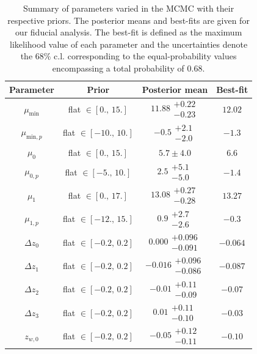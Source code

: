 \documentclass[a4paper,11pt]{article}
\newcommand\Tstrut{\rule{0pt}{3ex}}
\begin{document}
    \begin{table}
      \caption{Summary of parameters varied in the MCMC with their respective priors. The posterior means and best-fits are given for our fiducial analysis. The best-fit is defined as the maximum likelihood value of each parameter and the uncertainties denote the $68 \%$ c.l. corresponding to the equal-probability values encompassing a total probability of 0.68.} \label{tab:params}
      \begin{center}
        \begin{tabular}{cccc}
          \hline\hline 
          Parameter & Prior & Posterior mean & Best-fit \\ \hline \Tstrut                             
          $\mu_{\mathrm{min}}$ & flat $\in [0., \,15.]$ & $11.88\substack{+0.22 \\ -0.23}$ & $12.02$ \\ 
          $\mu_{\mathrm{min}, p}$ & flat $\in [-10., \,10.]$ & $-0.5\substack{+2.1 \\ -2.0}$ & $-1.3$ \\
          $\mu_{0}$ & flat $\in [0., \,15.]$ & $5.7 \pm 4.0$ & $6.6$ \\
          $\mu_{0, p}$ & flat $\in [-5., \,10.]$ & $2.5\substack{+5.1 \\ -5.0}$ & $-1.4$ \\
          $\mu_{1}$ & flat $\in [0., \,17.]$ & $13.08\substack{+0.27 \\ -0.28}$ & $13.27$ \\ 
          $\mu_{1, p}$ & flat $\in [-12., \,15.]$ & $0.9\substack{+2.7 \\ -2.6}$ & $-0.3$ \\
          $\Delta z_{0}$ & flat $\in [-0.2, \,0.2]$ & $0.000\substack{+0.096 \\ -0.091}$ & $-0.064$ \\
          $\Delta z_{1}$ & flat $\in [-0.2, \,0.2]$ & $-0.016\substack{+0.096 \\ -0.086}$ & $-0.087$ \\
          $\Delta z_{2}$ & flat $\in [-0.2, \,0.2]$ & $-0.01\substack{+0.11 \\ -0.09}$ & $-0.07$ \\
          $\Delta z_{3}$ & flat $\in [-0.2, \,0.2]$ & $0.01\substack{+0.11 \\ -0.10}$ & $-0.03$ \\
          $z_{w, 0}$ & flat $\in [-0.2, \,0.2]$ & $-0.05\substack{+0.12 \\ -0.11}$ & $-0.10$ \\

\end{tabular}
\end{center}
\end{table}
\end{document}
